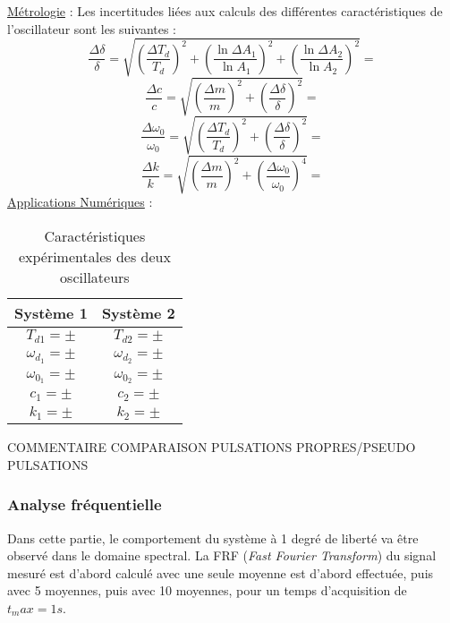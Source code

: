 \underline{Métrologie} :
Les incertitudes liées aux calculs des différentes caractéristiques de l'oscillateur sont les suivantes :
\begin{equation*}
    \frac{\Delta\delta}{\delta}=\sqrt{\left(\frac{\Delta T_d}{T_d}\right)^2+\left(\frac{\ln{\Delta A_1}}{\ln{A_1}}\right)^2+\left(\frac{\ln{\Delta A_2}}{\ln{A_2}}\right)^2}=
\end{equation*}
\begin{equation*}
    \frac{\Delta c}{c}=\sqrt{\left(\frac{\Delta m}{m}\right)^2+\left(\frac{\Delta\delta}{\delta}\right)^2}=
\end{equation*}
\begin{equation*}
    \frac{\Delta\omega_0}{\omega_0}=\sqrt{\left(\frac{\Delta T_d}{T_d}\right)^2+\left(\frac{\Delta\delta}{\delta}\right)^2}=
\end{equation*}
\begin{equation*}
    \frac{\Delta k}{k}=\sqrt{\left(\frac{\Delta m}{m}\right)^2+\left(\frac{\Delta\omega_0}{\omega_0}\right)^4}=
\end{equation*}
\underline{Applications Numériques} :
\begin{table}[h!]
    \centering
    \begin{tabular}{|c|c|}
        \hline
        Système 1 & Système 2 \\
        \hline    
        $T_{d1}= \pm$ & $T_{d2}= \pm$ \\
        \hline
        $\omega_d_1= \pm$ & $\omega_d_2= \pm$ \\
        \hline
        $\omega_0_1= \pm$ & $\omega_0_2= \pm$ \\
        \hline
        $c_1= \pm$ & $c_2= \pm$ \\
        \hline
        $k_1= \pm$ & $k_2= \pm$ \\
        \hline
    \end{tabular}
    \caption{Caractéristiques expérimentales des deux oscillateurs}
    \label{tab:resultats}
\end{table}{}

COMMENTAIRE COMPARAISON PULSATIONS PROPRES/PSEUDO PULSATIONS

\subsubsection{Analyse fréquentielle}
Dans cette partie, le comportement du système à 1 degré de liberté va être observé dans le domaine spectral.
La FRF (\textit{Fast Fourier Transform}) du signal mesuré est d'abord calculé avec une seule moyenne est d'abord effectuée, puis avec 5 moyennes, puis avec 10 moyennes, pour un temps d'acquisition de $t_max=1s$.

